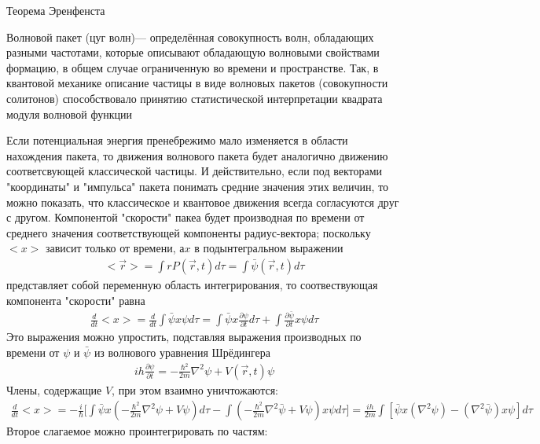 	Теорема Эренфенста\\
	
	\begin{definition}
		Волновой пакет (цуг волн)— определённая совокупность волн, обладающих разными частотами, которые описывают обладающую волновыми свойствами формацию, в общем случае ограниченную во времени и пространстве. Так, в квантовой механике описание частицы в виде волновых пакетов (совокупности солитонов) способствовало принятию статистической интерпретации квадрата модуля волновой функции
	\end{definition}
	
	Если потенциальная энергия пренебрежимо мало изменяется в области нахождения пакета, то движения волнового пакета будет аналогично движению соответсвующей классической частицы. И действительно, если под векторами "координаты" и "импульса" пакета понимать средние значения этих величин, то можно показать, что  классическое и квантовое движения всегда согласуются друг с другом. Компонентой "скорости" пакеа будет производная по времени от среднего значения соответствующей компоненты радиус-вектора; поскольку $<x>$ зависит только от времени, $а x$ в подынтегральном выражении 
	\begin{gather*}
	<\vec{r}>	= \int{rP(\vec{r},t)}d\tau = \int{\bar{\psi}(\vec{r},t)d\tau}
	\end{gather*}
	представляет собой переменную область интегрирования, то соотвествующая компонента "скорости" равна
	\begin{gather*}
	\frac{d}{dt}<x> = \frac{d}{dt}\int{\bar{\psi}x\psi}d\tau = \int{\bar{\psi}x\frac{\partial{\psi}}{\partial{t}}d\tau} + \int{\frac{\partial{\bar{\psi}}}{\partial{t}}x\psi d\tau}
	\end{gather*}
	Это выражения можно упростить, подставляя выражения производных по времени от $\psi$ и $\bar{\psi}$ из волнового уравнения Шрёдингера
	\begin{gather*}
	ih\frac{\partial{\psi}}{\partial{t}} = -\frac{\hbar^2}{2m}\nabla^2\psi + V(\vec{r},t)\psi
	\end{gather*}
	Члены, содержащие $V$, при этом взаимно уничтожаются:
	\begin{gather*}
	\frac{d}{dt}<x> = -\frac{i}{\hbar}\big[\int{\bar{\psi}x(-\frac{\hbar^2}{2m}\nabla^2\psi + V\psi)d\tau} - \int{(-\frac{\hbar^2}{2m}\nabla^2\bar{\psi} + V\psi)x\psi d\tau}\big] = \frac{ih}{2m}\int{[\bar{\psi}x(\nabla^2\psi)-(\nabla^2\bar{\psi})x\psi]d\tau} 
	\end{gather*}
	Второе слагаемое можно проинтегрировать по частям:
